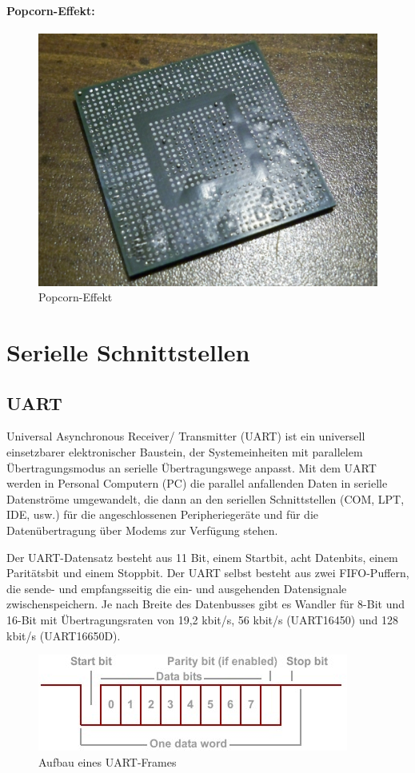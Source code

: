 \paragraph{Popcorn-Effekt:} %
\begin{figure}[H]
	\centering
	\includegraphics[width=.5\linewidth]{images/technische_grundlagen/popcornEffekt.jpg}%
	\caption{Popcorn-Effekt}
\end{figure}

\section{Serielle Schnittstellen}
\subsection{UART}
Universal Asynchronous Receiver/ Transmitter (UART) ist ein universell einsetzbarer elektronischer Baustein, der Systemeinheiten mit parallelem Übertragungsmodus an serielle Übertragungswege anpasst. 
Mit dem UART werden in Personal Computern (PC) die parallel anfallenden Daten in serielle Datenströme umgewandelt, die dann an den seriellen Schnittstellen (COM, LPT, IDE, usw.) für die angeschlossenen Peripheriegeräte und für die Datenübertragung über Modems zur Verfügung stehen. \cite{itwissen-uart}\par

Der UART-Datensatz besteht aus 11 Bit, einem Startbit, acht Datenbits, einem Paritätsbit und einem Stoppbit.
Der UART selbst besteht aus zwei FIFO-Puffern, die sende- und empfangsseitig die ein- und ausgehenden Datensignale zwischenspeichern.
Je nach Breite des Datenbusses gibt es Wandler für 8-Bit und 16-Bit mit Übertragungsraten von 19,2 kbit/s, 56 kbit/s (UART16450) und 128 kbit/s (UART16650D). \cite{itwissen-uart}\par
\begin{figure}[H]
	\centering
	\includegraphics[width=.9\linewidth]{images/technische_grundlagen/tide_uart_data.png}
	\caption{Aufbau eines UART-Frames \cite{tibbo-uart}}
\end{figure}

